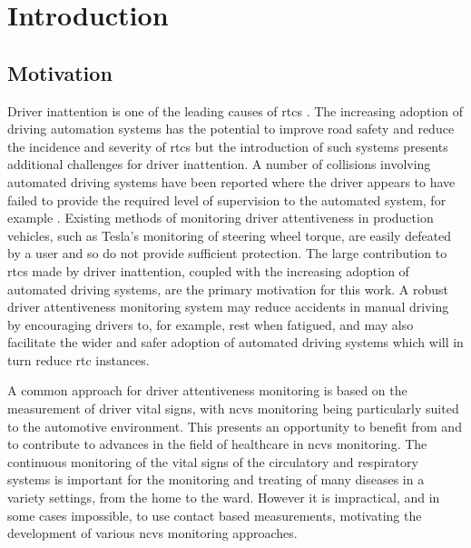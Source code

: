 \documentclass[11pt, parskip=half*,twoside=false]{scrbook}
\begin{document}
\printnoidxglossary[sort=letter, title={List of Abbreviations}]

\mainmatter

\chapter{Introduction} \label{ch:intro}

\section{Motivation} \label{sec:motive}

Driver inattention is one of the leading causes of \glspl{rtc} \citep{petridouHumanFactorsCausation2000,youngDriverDistraction2007,olsonDriverDistractionCommercial2009}. The increasing adoption of driving automation systems has the potential to improve road safety and reduce the incidence and severity of \glspl{rtc} \citep{favaroExaminingAccidentReports2017} but the introduction of such systems presents additional challenges for driver inattention. A number of collisions involving automated driving systems have been reported where the driver appears to have failed to provide the required level of supervision to the automated system, for example \citep{ntsbCollisionSportUtility2019,ntsbCollisionCarOperating2019}. Existing methods of monitoring driver attentiveness in production vehicles, such as Tesla's monitoring of steering wheel torque, are easily defeated by a user and so do not provide sufficient protection. The large contribution to \glspl{rtc} made by driver inattention, coupled with the increasing adoption of automated driving systems, are the primary motivation for this work. A robust driver attentiveness monitoring system may reduce accidents in manual driving by encouraging drivers to, for example, rest when fatigued, and may also facilitate the wider and safer adoption of automated driving systems which will in turn reduce \gls{rtc} instances. 

A common approach for driver attentiveness monitoring is based on the measurement of driver vital signs, with \gls{ncvs} monitoring being particularly suited to the automotive environment. This presents an opportunity to benefit from and to contribute to advances in the field of healthcare in \gls{ncvs} monitoring. The continuous monitoring of the vital signs of the circulatory and respiratory systems is important for the monitoring and treating of many diseases in a variety settings, from the home to the ward. However it is impractical, and in some cases impossible, to use contact based measurements, motivating the development of various \gls{ncvs} monitoring approaches. 
\end{document}
